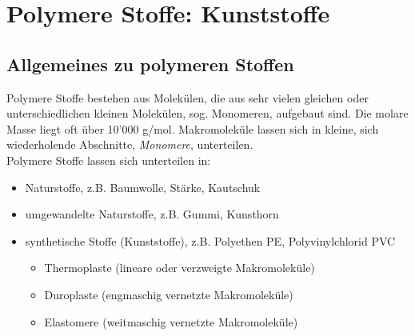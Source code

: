 \section{Polymere Stoffe: Kunststoffe}
\subsection{Allgemeines zu polymeren Stoffen}
Polymere Stoffe bestehen aus Molekülen, die aus sehr vielen gleichen oder unterschiedlichen kleinen Molekülen, sog. Monomeren, aufgebaut sind. Die molare Masse liegt oft über 10'000 g/mol. Makromoleküle lassen sich in kleine, sich wiederholende Abschnitte, \emph{Monomere}, unterteilen. \\
Polymere Stoffe lassen sich unterteilen in:
\begin{itemize}
	\item Naturstoffe, z.B. Baumwolle, Stärke, Kautschuk
	\item umgewandelte Naturstoffe, z.B. Gummi, Kunsthorn
	\item synthetische Stoffe (Kunststoffe), z.B. Polyethen PE, Polyvinylchlorid PVC
	\begin{itemize}
		\item Thermoplaste (lineare oder verzweigte Makromoleküle)
		\item Duroplaste (engmaschig vernetzte Makromoleküle)
		\item Elastomere (weitmaschig vernetzte Makromoleküle)
	\end{itemize}
\end{itemize}

